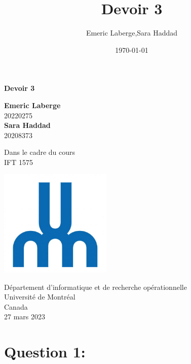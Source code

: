\documentclass{article}
\title{Devoir 3}
\author{Emeric Laberge,Sara Haddad}
\date{\today}
\begin{document}
\begin{titlepage}
   \begin{center}
      \vspace*{1cm}
                  
      \Huge
      \textbf{Devoir 3} 
                  
      \vspace{0.5cm}
      \LARGE
                  
      \vspace{1.5cm}
                  
      \textbf{Emeric Laberge}\\ 20220275 \\ \textbf{Sara Haddad} \\ 20208373
                  
      \vfill
                  
      Dans le cadre du cours\\
      IFT 1575
      
                  
      \vspace{0.8cm}
                  
      \includegraphics[width=0.4\textwidth]{Université-de-Montréal.jpg}
                   
      \Large
      Département d'informatique et de recherche opérationnelle\\
      Université de Montréal\\
      Canada\\
      27 mars 2023
                  
    \end{center}
\end{titlepage}

\section*{Question 1:}
\end{document}
